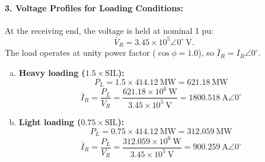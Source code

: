 \paragraph{3. Voltage Profiles for Loading Conditions:}
At the receiving end, the voltage is held at nominal 1 pu:
\[
\bar{V}_R = 3.45 \times 10^5\angle 0^\circ\ \text{V}.
\]
The load operates at unity power factor ($\cos\phi = 1.0$), so $\bar{I}_R = I_R \angle 0^\circ$.
\begin{enumerate}[(a)]
    \item \textbf{Heavy loading ($1.5 \times \text{SIL}$):}
    \[
    P_L = 1.5 \times 414.12\ \text{MW} = 621.18\ \text{MW}
    \]
    \[
    \bar{I}_R = \frac{P_L}{V_R} = \frac{621.18 \times 10^6\ \text{W}}{3.45 \times 10^5\ \text{V}} = 1800.518\ \text{A}\angle 0^\circ
    \]
    
    \item \textbf{Light loading ($0.75 \times \text{SIL}$):}
    \[
    P_L = 0.75 \times 414.12\ \text{MW} = 312.059\ \text{MW}
    \]
    \[
    \bar{I}_R = \frac{P_L}{V_R} = \frac{312.059 \times 10^6\ \text{W}}{3.45 \times 10^5\ \text{V}} = 900.259\ \text{A}\angle 0^\circ
    \]
\end{enumerate}

